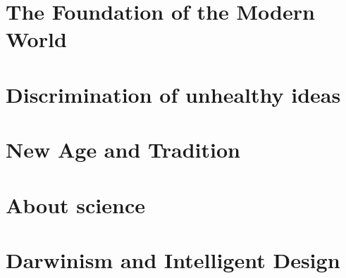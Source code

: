 \documentclass[a4paper,12pt,twoside]{book}
\begin{document}
\chapter{The Foundation of the Modern World}







\chapter{Discrimination of unhealthy ideas}



%










\chapter{New Age and Tradition}





\chapter{About science}

















\chapter{Darwinism and Intelligent Design}










\end{document}
